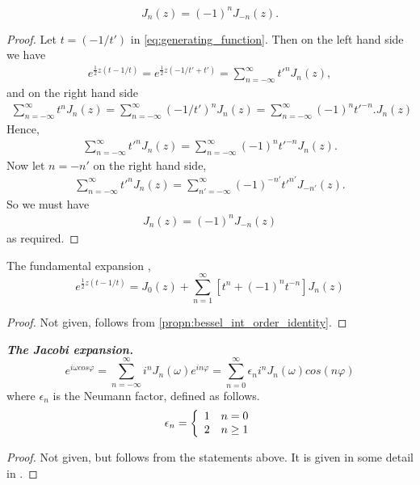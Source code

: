 \begin{propn} \label{propn:bessel_int_order_identity}
  \begin{equation}
    J_n(z) = (-1)^n J_{-n}(z).
  \end{equation}
\end{propn}
\begin{proof}
  Let $t= (-1/t')$ in \eqref{eq:generating_function}. Then on the left hand side we have
  \begin{align*}
    e^{\frac{1}{2} z(t-1/t)} = e^{\frac{1}{2} z(-1/t'+t')} = \sum _{n=-\infty}^{\infty} t'^nJ_{n}(z),
  \end{align*}
  and on the right hand side
  \begin{align*}
    \sum _{n=-\infty}^{\infty} t^nJ_{n}(z) = \sum _{n=-\infty}^{\infty} (-1/t')^nJ_{n}(z) = \sum _{n=-\infty}^{\infty} (-1)^n t'^{-n}. J_{n}(z)
  \end{align*}
  Hence,
  \begin{align*}
    \sum _{n=-\infty}^{\infty} t'^nJ_{n}(z) = \sum _{n=-\infty}^{\infty} (-1)^n t'^{-n} J_{n}(z).
  \end{align*}
  Now let $n=-n'$ on the right hand side,
  \begin{align*}
    \sum _{n=-\infty}^{\infty} t'^nJ_{n}(z) = \sum _{n'=-\infty}^{\infty} (-1)^{-n'} t'^{n'} J_{-n'}(z).
  \end{align*}
  So we must have
  \begin{align*}
    J_{n}(z) = (-1)^n J_{-n}(z)
  \end{align*}
  as required.
\end{proof}

\begin{propn} The fundamental expansion \parencite{watson44besselfunc},
  \begin{equation}\label{eq:fundamental_expansion}
    e^{\frac{1}{2} z(t-1/t)} = J_0(z) + \sum^{\infty}_{n=1} \left[ t^n + (-1)^nt^{-n} \right] J_n(z)
  \end{equation}
\end{propn}
\begin{proof}
  Not given, follows from \ref{propn:bessel_int_order_identity}.
\end{proof}

\begin{propn}\label{propn:jacobi_expansion}
\textbf{\emph{The Jacobi expansion.}}
    \[
    e ^{i \omega cos \varphi}
    = \sum^\infty_{n=-\infty} i^n J_n (\omega) e^{in\varphi}
    = \sum^\infty_{n=0} \epsilon_n i^n J_n(\omega) cos(n \varphi)
    \]
where $\epsilon_n$ is the Neumann factor, defined as follows.
    \begin{align*}
        \epsilon_n =\left\{
            \begin{array}{c l}
                 1 & n = 0 \\
                 2 & n \geq 1
            \end{array}\right.
    \end{align*}
\end{propn}
\begin{proof}
  Not given, but follows from the statements above. It is given in some detail in \parencite{watson44besselfunc}.
\end{proof}

